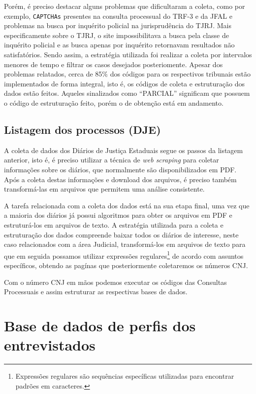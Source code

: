 \documentclass[12pt]{article}
\begin{document}
Porém, é preciso destacar alguns problemas que dificultaram a coleta,
como por exemplo, \texttt{CAPTCHAs} presentes na consulta processual do
TRF-3 e da JFAL e problemas na busca por inquérito policial na
jurisprudência do TJRJ. Mais especificamente sobre o TJRJ, o site
impossibilitava a busca pela classe de inquérito policial e as busca
apenas por inquérito retornavam resultados não satisfatórios. Sendo
assim, a estratégia utilizada foi realizar a coleta por intervalos
menores de tempo e filtrar os casos desejados posteriomente. Apesar dos
problemas relatados, cerca de 85\% dos códigos para os respectivos
tribunais estão implementados de forma integral, isto é, os códigos de
coleta e estruturação dos dados estão feitos. Aqueles sinalizados como
``PARCIAL'' significam que possuem o código de estruturação feito, porém
o de obtenção está em andamento.

\subsection{Listagem dos processos
(DJE)}\label{listagem-dos-processos-dje}

A coleta de dados dos Diários de Justiça Estaduais segue os passos da
listagem anterior, isto é, é preciso utilizar a técnica de \emph{web
scraping} para coletar informações sobre os diários, que normalmente são
disponibilizados em PDF. Após a coleta destas informações e download dos
arquivos, é preciso também transformá-las em arquivos que permitem uma
análise consistente.

A tarefa relacionada com a coleta dos dados está na sua etapa final, uma
vez que a maioria dos diários já possui algoritmos para obter os
arquivos em PDF e estruturá-los em arquivos de texto. A estratégia
utilizada para a coleta e estruturação dos dados compreende baixar todos
os diários de interesse, neste caso relacionados com a área Judicial,
transformá-los em arquivos de texto para que em seguida possamos
utilizar expressões regulares\footnote{Expressões regulares são
  sequências específicas utilizadas para encontrar padrões em
  caracteres.} de acordo com assuntos específicos, obtendo as pagínas
que posteriormente coletaremos os números CNJ.

Com o número CNJ em mãos podemos executar os códigos das Consultas
Processuais e assim estruturar as respectivas bases de dados.

\section{Base de dados de perfis dos
entrevistados}\label{base-de-dados-de-perfis-dos-entrevistados}
\end{document}
